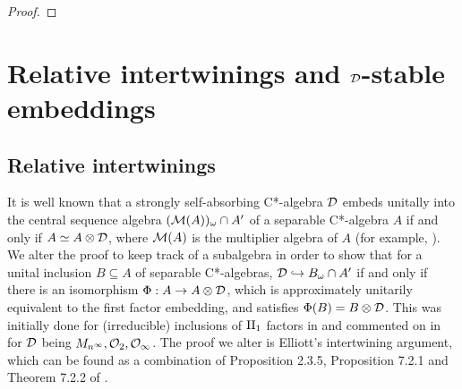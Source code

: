 \documentclass[12pt]{amsart}
\begin{document}
\begin{lemma}
\begin{proof}

      \end{proof}
  \end{lemma}

  \section{Relative intertwinings and $\mathcal{D}$-stable embeddings}\label{section:dse-embeddings}

  \subsection{Relative intertwinings}\label{ssectoin:dse-relative-intertwinings}  It is well known that a strongly self-absorbing C*-algebra $\mathcal{D}$ embeds unitally into the central sequence algebra $(\mathcal{M}(A))_\omega \cap A'$ of a separable C*-algebra $A$ if and only if $A \simeq A \otimes \mathcal{D}$, where $\mathcal{M}(A)$ is the multiplier algebra of $A$ (for example, \cite[Theorem 7.2.2(i)]{RordamBook}). We alter the proof to keep track of a subalgebra in order to show that for a unital inclusion $B \subseteq A$ of separable C*-algebras, $\mathcal{D} \hookrightarrow B_\omega \cap A'$ if and only if there is an isomorphism $\Phi: A \to A \otimes \mathcal{D}$, which is approximately unitarily equivalent to the first factor embedding, and satisfies $\Phi(B) = B \otimes \mathcal{D}$. This was initially done for (irreducible) inclusions of $\text{II}_1$ factors in \cite{Bisch90} and commented on in \cite{Izumi04} for $\mathcal{D}$ being $M_{n^{\infty}},\mathcal{O}_2,\mathcal{O}_{\infty}$. The proof we alter is Elliott's intertwining argument, which can be found as a combination of Proposition 2.3.5, Proposition 7.2.1 and Theorem 7.2.2 of \cite{RordamBook}.
\end{document}
